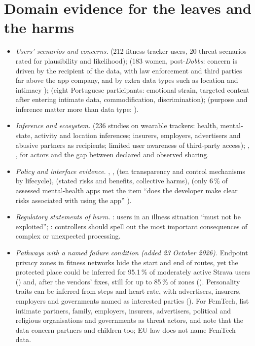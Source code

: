 \section{Domain evidence for the leaves and the harms}
\begin{itemize}
\item \emph{Users' scenarios and concerns.}  (212 fitness-tracker users, 20 threat scenarios rated for plausibility and likelihood);  (183 women, post-\emph{Dobbs}: concern is driven by the recipient of the data, with law enforcement and third parties far above the app company, and by extra data types such as location and intimacy );  (eight Portuguese participants: emotional strain, targeted content after entering intimate data, commodification, discrimination);  (purpose and inference matter more than data type: ).
\item \emph{Inference and ecosystem.}  (236 studies on wearable trackers: health, mental-state, activity and location inferences; insurers, employers, advertisers and abusive partners as recipients; limited user awareness of third-party access); , ,  for actors and the gap between declared and observed sharing.
\item \emph{Policy and interface evidence.} , ,  (ten transparency and control mechanisms by lifecycle),  (stated risks and benefits, collective harms),  (only 6\,\% of assessed mental-health apps met the item ``does the developer make clear risks associated with using the app'' ).
\item \emph{Regulatory statements of harm.} : users in an illness situation ``must not be exploited''; : controllers should spell out the most important consequences of complex or unexpected processing.
\item \emph{Pathways with a named failure condition (added 23 October 2026).} Endpoint privacy zones in fitness networks hide the start and end of routes, yet the protected place could be inferred for 95.1\,\% of moderately active Strava users () and, after the vendors' fixes, still for up to 85\,\% of zones  (). Personality traits can be inferred from steps and heart rate, with advertisers, insurers, employers and governments named as interested parties (). For FemTech,  list intimate partners, family, employers, insurers, advertisers, political and religious organisations and governments as threat actors, and note that the data concern partners and children too; EU law does not name FemTech data.
\end{itemize}

